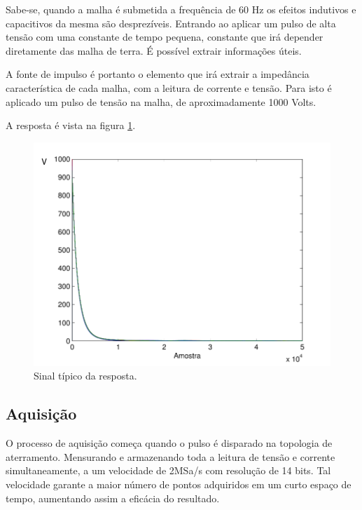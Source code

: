 \documentclass[a4paper, 10pt]{article}
\begin{document}
Sabe-se, quando a malha é submetida a frequência de 60 Hz os efeitos indutivos e 
capacitivos da mesma são desprezíveis. Entrando ao aplicar um pulso de 
alta tensão com uma constante de tempo pequena, constante que irá 
depender diretamente das malha de terra. É possível extrair informações
úteis. 

A fonte de impulso é portanto o elemento que irá extrair a impedância
característica de cada malha, com a leitura de corrente e tensão. 
Para isto é aplicado um pulso de tensão na malha, de aproximadamente
1000 Volts. 

A resposta é vista na figura \ref{fig_sinal}. 

\begin{figure}[!h]
    \caption{\label{fig_sinal} Sinal típico da resposta.}
	    \begin{center}
            \includegraphics[scale=0.5]{../fotos/sinal/sinal-eps-converted-to.pdf}
	    \end{center}
\end{figure}

\subsection{Aquisição}

O processo de aquisição começa quando o pulso é disparado na topologia de aterramento.
Mensurando e armazenando toda a leitura de tensão e corrente simultaneamente, a um velocidade
de 2MSa/s com resolução de 14 bits. 
Tal velocidade garante a maior número de pontos adquiridos em um curto espaço de tempo, 
aumentando assim a eficácia do resultado.
\end{document}

